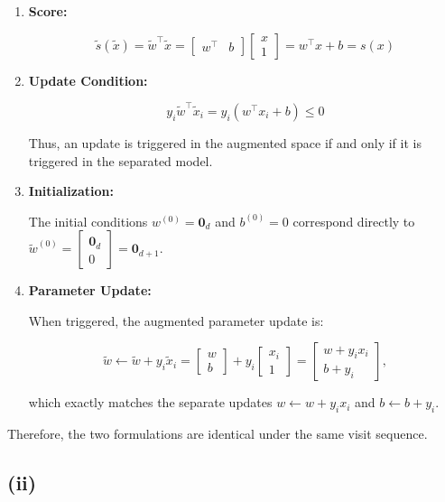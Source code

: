 \documentclass[11pt]{article}
\begin{document}
\begin{enumerate}
    \item \textbf{Score:}
    
    $$
    \tilde{s}(\tilde{x}) = \tilde{w}^\top \tilde{x} = \begin{bmatrix} w^\top & b \end{bmatrix} \begin{bmatrix} x \\ 1 \end{bmatrix} = w^\top x + b = s(x)
    $$

    \item \textbf{Update Condition:}
    
    $$
    y_i \tilde{w}^\top \tilde{x}_i = y_i (w^\top x_i + b) \le 0
    $$

    Thus, an update is triggered in the augmented space if and only if it is triggered in the separated model.
    
    \item \textbf{Initialization:}
    
    The initial conditions $w^{(0)} = \mathbf{0}_d$ and $b^{(0)} = 0$ correspond directly to $\tilde{w}^{(0)} = \begin{bmatrix} \mathbf{0}_d \\ 0 \end{bmatrix} = \mathbf{0}_{d+1}$.
    
    \item \textbf{Parameter Update:}
    
    When triggered, the augmented parameter update is:
    
    $$
    \tilde{w} \leftarrow \tilde{w} + y_i \tilde{x}_i = \begin{bmatrix} w \\ b \end{bmatrix} + y_i \begin{bmatrix} x_i \\ 1 \end{bmatrix} = \begin{bmatrix} w + y_i x_i \\ b + y_i \end{bmatrix},
    $$

    which exactly matches the separate updates $w \leftarrow w + y_i x_i$ and $b \leftarrow b + y_i$.
\end{enumerate}

Therefore, the two formulations are identical under the same visit sequence.

\subsection*{(ii)}
\end{document}
